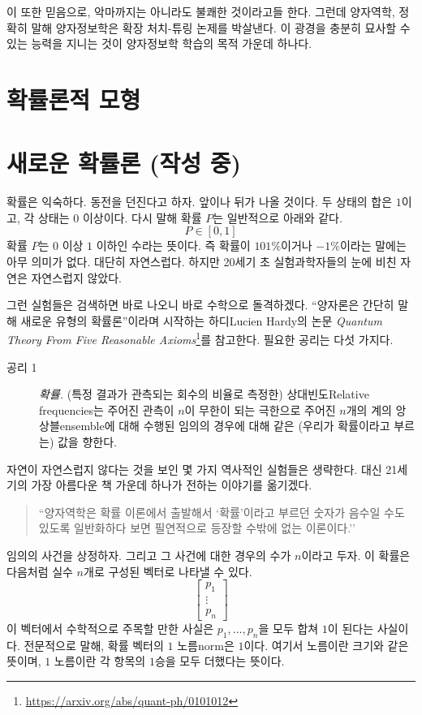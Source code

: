 \documentclass[a4paper,chapter,atbegshi]{oblivoir}
\begin{document}
이 또한 믿음으로, 악마까지는 아니라도 불쾌한 것이라고들 한다. 그런데 양자역학,
정확히 말해 양자정보학은 확장 처치-튜링 논제를 박살낸다. 이 광경을 충분히 묘사할
수 있는 능력을 지니는 것이 양자정보학 학습의 목적 가운데 하나다. 

\chapter{확률론적 모형}


\chapter{새로운 확률론 (작성 중)} 
확률은 익숙하다. 동전을 던진다고 하자. 앞이나 뒤가 나올 것이다. 두 상태의 합은
$1$이고, 각 상태는 $0$ 이상이다. 다시 말해 확률 $P$는 일반적으로 아래와 같다.
\[
  P\in[0,1]
\]
확률 $P$는 $0$ 이상 $1$ 이하인 수라는 뜻이다. 즉 확률이 $101\%$이거나 $-1\%$이라는
말에는 아무 의미가 없다. 대단히 자연스럽다. 하지만 20세기 초 실험과학자들의 눈에
비친 자연은 자연스럽지 않았다. 

그런 실험들은 검색하면 바로 나오니 바로 수학으로 돌격하겠다. ``양자론은 간단히
말해 새로운 유형의 확률론''이라며 시작하는 하디{\tiny Lucien Hardy}의 
논문 {\slshape Quantum Theory From Five Reasonable Axioms}\footnote{ 
\url{https://arxiv.org/abs/quant-ph/0101012}}를 참고한다. 필요한 공리는
다섯 가지다. 
\begin{description}
  \item[공리 1]\emph{확률.} (특정 결과가 관측되는 회수의 비율로 측정한)
    상대빈도{\tiny Relative frequencies}는 주어진 관측이 $n$이 무한이
    되는 극한으로 주어진 $n$개의 계의 
    앙상블{\tiny ensemble}에 대해 수행된 임의의 경우에 대해 같은
    (우리가 확률이라고 부르는) 값을 향한다. 
\end{description}

자연이 자연스럽지 않다는 것을 보인 몇 가지 역사적인 실험들은 생략한다. 대신
21세기의 가장 아름다운 책 가운데 하나가 전하는 이야기를 옮기겠다.
\begin{quote}
  ``양자역학은 확률 이론에서 출발해서 `확률'이라고 부르던 숫자가 음수일 수도
  있도록 일반화하다 보면 필연적으로 등장할 수밖에 없는 이론이다.''
\end{quote}
임의의 사건을 상정하자. 그리고 그 사건에 대한 경우의 수가 $n$이라고 두자.
이 확률은 다음처럼 실수 $n$개로 구성된 벡터로 나타낼 수 있다. 
\[
  \begin{bmatrix}p_1\\\vdots\\p_n\end{bmatrix}
\]
이 벡터에서 수학적으로 주목할 만한 사실은 $p_1,\ldots,p_n$을 모두 합쳐 $1$이
된다는 사실이다. 전문적으로 말해, 확률 벡터의 $1$ 노름{\tiny norm}은 $1$이다.
여기서 노름이란 크기와 같은 뜻이며, $1$ 노름이란 각 항목의 $1$승을 모두 더했다는 
뜻이다. 
\end{document}
